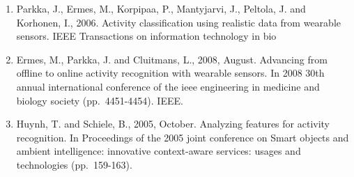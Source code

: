 \documentclass[11pt]{article}
\makeatletter
\newcommand{\boxspacing}{\kern\kvtcb@left@rule\kern\kvtcb@boxsep}
\newcommand{\prompt}[4]{
        \ttfamily\llap{{\color{#2}[#3]:\hspace{3pt}#4}}\vspace{-\baselineskip}
    }
\makeatother
\begin{document}
\begin{enumerate}
\def\labelenumi{\arabic{enumi}.}
\item
  Parkka, J., Ermes, M., Korpipaa, P., Mantyjarvi, J., Peltola, J. and
  Korhonen, I., 2006. Activity classification using realistic data from
  wearable sensors. IEEE Transactions on information technology in bio
\item
  Ermes, M., Parkka, J. and Cluitmans, L., 2008, August. Advancing from
  offline to online activity recognition with wearable sensors. In 2008
  30th annual international conference of the ieee engineering in
  medicine and biology society (pp.~4451-4454). IEEE.
\item
  Huynh, T. and Schiele, B., 2005, October. Analyzing features for
  activity recognition. In Proceedings of the 2005 joint conference on
  Smart objects and ambient intelligence: innovative context-aware
  services: usages and technologies (pp.~159-163).
\end{enumerate}

    \begin{tcolorbox}[breakable, size=fbox, boxrule=1pt, pad at break*=1mm,colback=cellbackground, colframe=cellborder]
\prompt{In}{incolor}{ }{\boxspacing}
\begin{Verbatim}[commandchars=\\\{\}]

\end{Verbatim}
\end{tcolorbox}


    
    
    
\end{document}
